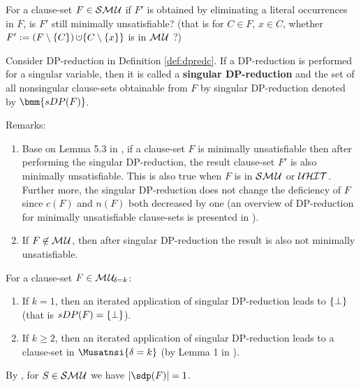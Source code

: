 \documentclass{article}
\begin{document}
\begin{quest}\label{que:smu-elim}
For a clause-set $F \in \mathcal{S}\mathcal{M\hspace{0.8pt}U}$ if $F'$ is obtained by eliminating a literal occurrences in $F$, is $F'$ still minimally unsatisfiable? (that is for $C \in F$, $x \in C$, whether $F' := (F \sm \set{C}) \addcup \set{C \sm \set{x}}$ is in $\mathcal{M\hspace{0.8pt}U}$ ?)
\end{quest}
\begin{defi}\label{def:singularDP}
Consider DP-reduction in Definition \ref{def:dpredc}. If a DP-reduction is performed for a singular variable, then it is called a \textbf{singular DP-reduction} and the set of all nonsingular clause-sets obtainable from $F$ by singular DP-reduction denoted by $\bmm{sDP(F)}$. 
\end{defi}
Remarks:
  \begin{enumerate}
  \item Base on Lemma 5.3 in \cite{KullmannZhao2010Extremal}, if a clause-set $F$ is minimally unsatisfiable then after performing the singular DP-reduction, the result clause-set $F'$ is also minimally unsatisfiable. This is also true when $F$ is in $\mathcal{S}\mathcal{M\hspace{0.8pt}U}$ or $\mathcal{U}\mathcal{HIT}$.   Further more, the singular DP-reduction does not change the deficiency of $F$ since $c(F)$ and $n(F)$ both decreased by one (an overview of DP-reduction for minimally unsatisfiable clause-sets is presented in \cite{KullmannZhao2012ConfluenceJ}).
  \item If $F \not \in \mathcal{M\hspace{0.8pt}U}$, then after singular DP-reduction the result is also not minimally unsatisfiable.
  \end{enumerate}
  
\begin{lem}\label{lem:sDP-infl}
For a clause-set $F \in \mathcal{M\hspace{0.8pt}U}_{\!\delta=k}$:
  \begin{enumerate}
  \item If $k=1$, then an iterated application of singular DP-reduction leads to $\{ \bot \}$ (that is $sDP(F)=\{ \bot \}$).
  \item If $k \ge 2$, then an iterated application of singular DP-reduction leads to a clause-set in $\Musatnsi{\delta=k}$ (by Lemma 1 in \cite{KleineBuening2000SubclassesMU}).
  \end{enumerate}
\end{lem} 

\begin{lem}\label{lem:sDP-size}
By \cite{KullmannZhao2012ConfluenceJ}, for $S \in \mathcal{S}\mathcal{M\hspace{0.8pt}U}$ we have $\abs{\sdp(F)} = 1$.
\end{lem} 
\end{document}
